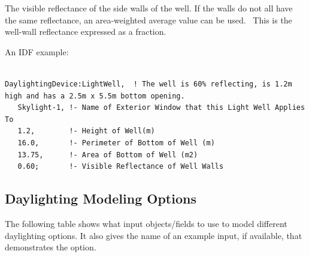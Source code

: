 The visible reflectance of the side walls of the well. If the walls do not all have the same reflectance, an area-weighted average value can be used.~ This is the well-wall reflectance expressed as a fraction.

An IDF example:

\begin{lstlisting}

DaylightingDevice:LightWell,  ! The well is 60% reflecting, is 1.2m high and has a 2.5m x 5.5m bottom opening.
   Skylight-1, !- Name of Exterior Window that this Light Well Applies To
   1.2,        !- Height of Well(m)
   16.0,       !- Perimeter of Bottom of Well (m)
   13.75,      !- Area of Bottom of Well (m2)
   0.60;       !- Visible Reflectance of Well Walls
\end{lstlisting}

\subsection{Daylighting Modeling Options}\label{daylighting-modeling-options}

The following table shows what input objects/fields to use to model different daylighting options. It also gives the name of an example input, if available, that demonstrates the option.

